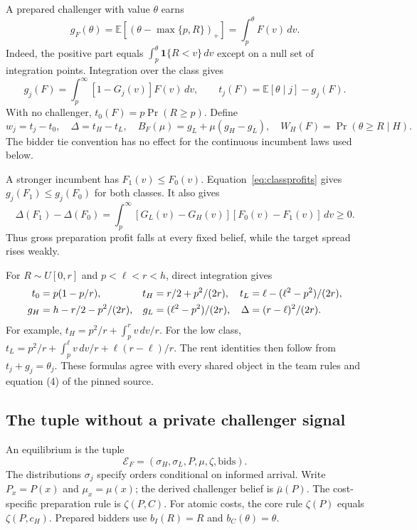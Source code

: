 \documentclass[12pt]{article}
\newcommand{\ind}{\mathbf 1}
\newcommand{\D}{\Delta}
\begin{document}
A prepared challenger with value $\theta$ earns
\begin{equation}\label{eq:rent}
 g_F(\theta)=\mathbb E[(\theta-\max\{p,R\})_+]
 =\int_p^\theta F(v)\,dv.
\end{equation}
Indeed, the positive part equals $\int_p^\theta\ind\{R<v\}\,dv$ except on a null set of integration points.
Integration over the class gives
\begin{equation}\label{eq:classprofits}
 g_j(F)=\int_p^\infty[1-G_j(v)]F(v)\,dv,
 \qquad t_j(F)=\mathbb E[\theta\mid j]-g_j(F).
\end{equation}
With no challenger, $t_0(F)=p\Pr(R\ge p)$.
Define
\[
 w_j=t_j-t_0,\quad \D=t_H-t_L,\quad
 B_F(\mu)=g_L+\mu(g_H-g_L),\quad
 W_H(F)=\Pr(\theta\ge R\mid H).
\]
The bidder tie convention has no effect for the continuous incumbent laws used below.

A stronger incumbent has $F_1(v)\le F_0(v)$.
Equation~\eqref{eq:classprofits} gives $g_j(F_1)\le g_j(F_0)$ for both classes.
It also gives
\[
 \D(F_1)-\D(F_0)
 =\int_p^\infty[G_L(v)-G_H(v)][F_0(v)-F_1(v)]\,dv\ge0.
\]
Thus gross preparation profit falls at every fixed belief, while the target spread rises weakly.

For $R\sim U[0,r]$ and $p<\ell<r<h$, direct integration gives
\begin{align}\label{eq:auction}
 t_0&=p(1-p/r),&
 t_H&=r/2+p^2/(2r),&
 t_L&=\ell-(\ell^2-p^2)/(2r),\\
 g_H&=h-r/2-p^2/(2r),&
 g_L&=(\ell^2-p^2)/(2r),&
 \D&=(r-\ell)^2/(2r).\notag
\end{align}
For example, $t_H=p^2/r+\int_p^r v\,dv/r$.
For the low class, $t_L=p^2/r+\int_p^\ell v\,dv/r+\ell(r-\ell)/r$.
The rent identities then follow from $t_j+g_j=\theta_j$.
These formulas agree with every shared object in the team rules and equation (4) of the pinned source.

\subsection{The tuple without a private challenger signal}

An equilibrium is the tuple
\begin{equation}\label{eq:tuple}
 \mathcal E_F=(\sigma_H,\sigma_L,P,\mu,\zeta,\mathrm{bids}).
\end{equation}
The distributions $\sigma_j$ specify orders conditional on informed arrival.
Write $P_x=P(x)$ and $\mu_x=\mu(x)$; the derived challenger belief is $\bar\mu(P)$.
The cost-specific preparation rule is $\zeta(P,C)$.
For atomic costs, the core rule $\zeta(P)$ equals $\zeta(P,c_H)$.
Prepared bidders use $b_I(R)=R$ and $b_C(\theta)=\theta$.
\end{document}
